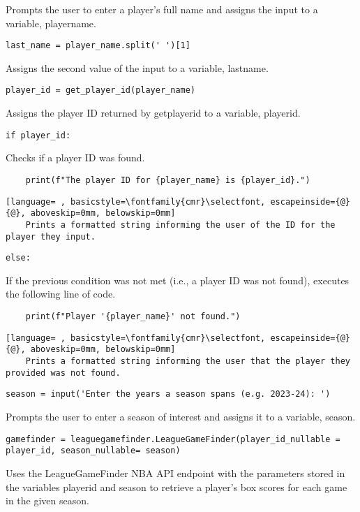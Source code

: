 \documentclass{article}
\begin{document}
Prompts the user to enter a player's full name and assigns the input to a variable, player\textunderscore name.
\begin{lstlisting}
last_name = player_name.split(' ')[1]
\end{lstlisting}
Assigns the second value of the input to a variable, last\textunderscore name.
\begin{lstlisting}
player_id = get_player_id(player_name)
\end{lstlisting}
Assigns the player ID returned by get\textunderscore player\textunderscore id to a variable, player\textunderscore id.
\begin{lstlisting}
if player_id:
\end{lstlisting}
Checks if a player ID was found.
\begin{lstlisting}
    print(f"The player ID for {player_name} is {player_id}.")
\end{lstlisting}
\begin{lstlisting}[language= , basicstyle=\fontfamily{cmr}\selectfont, escapeinside={@}{@}, aboveskip=0mm, belowskip=0mm]
    Prints a formatted string informing the user of the ID for the player they input.
\end{lstlisting}
\begin{lstlisting}
else:
\end{lstlisting}
If the previous condition was not met (i.e., a player ID was not found), executes the following line of code.
\begin{lstlisting}
    print(f"Player '{player_name}' not found.")
\end{lstlisting}
\begin{lstlisting}[language= , basicstyle=\fontfamily{cmr}\selectfont, escapeinside={@}{@}, aboveskip=0mm, belowskip=0mm]
    Prints a formatted string informing the user that the player they provided was not found.
\end{lstlisting}
\begin{lstlisting}
season = input('Enter the years a season spans (e.g. 2023-24): ')
\end{lstlisting}
Prompts the user to enter a season of interest and assigns it to a variable, season.
\begin{lstlisting}
gamefinder = leaguegamefinder.LeagueGameFinder(player_id_nullable = player_id, season_nullable= season)
\end{lstlisting}
Uses the LeagueGameFinder NBA API endpoint with the parameters stored in the variables player\textunderscore id and season to retrieve a player's box scores for each game in the given season.
\end{document}
